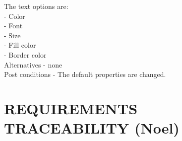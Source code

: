 \documentclass[twoside,letterpaper]{article}
\begin{document}
{\indent The text options are:\\
- Color\\
- Font\\
- Size\\
- Fill color\\
- Border color\\
Alternatives - none\\
Post conditions - The default properties are changed.\\




\clearpage\setcounter{page}{1}\pagestyle{Convertvi}
\section[REQUIREMENTS
TRACEABILITY (Noel and Max)]{\rmfamily\bfseries\color{black}
REQUIREMENTS TRACEABILITY (Noel)}

}
\end{document}
